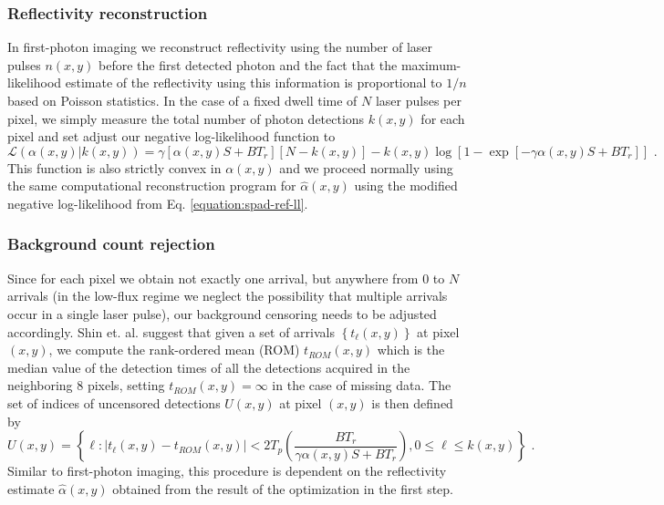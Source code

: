 \subsubsection{Reflectivity reconstruction}
In first-photon imaging we reconstruct reflectivity using the number of laser pulses $n(x,y)$ before the first detected photon and the fact that the maximum-likelihood estimate of the reflectivity using this information is proportional to $1/n$ based on Poisson statistics. In the case of a fixed dwell time of $N$ laser pulses per pixel, we simply measure the total number of photon detections $k(x,y)$ for each pixel and set adjust our negative log-likelihood function to
\begin{equation}
\mathcal{L}\left( \alpha(x,y) | k(x,y) \right) = \gamma \left[ \alpha(x,y) S + B T_r \right] \left[ N - k(x,y) \right] - k(x,y) \log \left[ 1 - \exp \left[ - \gamma \alpha(x,y) S + B T_r \right] \right]\,\,.
\label{equation:spad-ref-ll}
\end{equation}
This function is also strictly convex in $\alpha(x,y)$ and we proceed normally using the same computational reconstruction program for $\hat{\alpha}(x,y)$ using the modified negative log-likelihood from Eq. \ref{equation:spad-ref-ll}.

\subsubsection{Background count rejection}
Since for each pixel we obtain not exactly one arrival, but anywhere from $0$ to $N$ arrivals (in the low-flux regime we neglect the possibility that multiple arrivals occur in a single laser pulse), our background censoring needs to be adjusted accordingly. Shin et. al. \cite{kirmani-photon} suggest that given a set of arrivals $\left\{ t_\ell(x,y) \right\}$ at pixel $(x,y)$, we compute the rank-ordered mean (ROM) $t_{ROM}(x,y)$ which is the median value of the detection times of all the detections acquired in the neighboring 8 pixels, setting $t_{ROM}(x,y) = \infty$ in the case of missing data. The set of indices of uncensored detections $U(x,y)$ at pixel $(x,y)$ is then defined by
\begin{equation}
U(x,y) = \left\{ \ell : |t_\ell(x,y) - t_{ROM}(x,y)| < 2 T_p \left( \frac{BT_r}{\gamma \alpha(x,y)S + BT_r}  \right), 0 \leq \ell \leq k(x,y) \right\}\,\,.
\end{equation}
Similar to first-photon imaging, this procedure is dependent on the reflectivity estimate $\hat{\alpha}(x,y)$ obtained from the result of the optimization in the first step.

